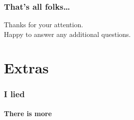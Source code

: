 \documentclass[aspectratio=169,compress,table,xcolor=table]{beamer}
\begin{document}
\begin{frame}
  \frametitle{That's all folks\dots}
  \centering
  \Huge
  Thanks for your attention.\\
  \Large
  Happy to answer any additional questions.
\end{frame}
\section{Extras}
\begin{frame}
  \frametitle{I lied}
  \framesubtitle{There is more}
\end{frame}
\end{document}
